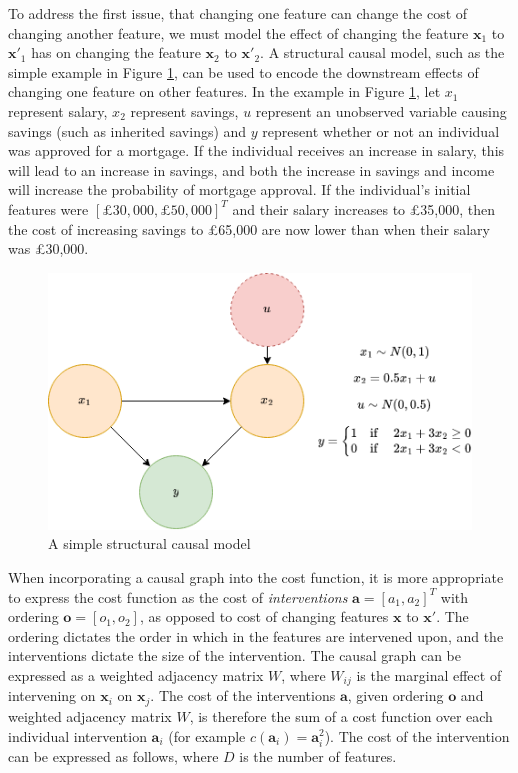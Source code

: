 To address the first issue, that changing one feature can change the cost of changing another feature, we must model the effect of changing the feature $\mathbf{x}_1$ to $\mathbf{x'}_1$ has on changing the feature $\mathbf{x}_2$ to $\mathbf{x'}_2$. A structural causal model, such as the simple example in Figure \ref{fig:toy_scm}, can be used to encode the downstream effects of changing one feature on other features. In the example in Figure \ref{fig:toy_scm}, let $x_1$ represent salary, $x_2$ represent savings, $u$ represent an unobserved variable causing savings (such as inherited savings) and $y$ represent whether or not an individual was approved for a mortgage. If the individual receives an increase in salary, this will lead to an increase in savings, and both the increase in savings and income will increase the probability of mortgage approval. If the individual's initial features were $[£30,000, £50,000]^T$ and their salary increases to £35,000, then the cost of increasing savings to £65,000 are now lower than when their salary was £30,000.

\begin{figure}[!htb]
	\centering
	\includegraphics[width=0.8\linewidth]{images/toy_scm.png}
	\caption{A simple structural causal model}
	\label{fig:toy_scm}
\end{figure}

When incorporating a causal graph into the cost function, it is more appropriate to express the cost function as the cost of \textit{interventions} $\mathbf{a}=[a_1, a_2]^T$ with ordering $\mathbf{o}=[o_1, o_2]$, as opposed to cost of changing features $\mathbf{x}$ to $\mathbf{x}'$. The ordering dictates the order in which in the features are intervened upon, and the interventions dictate the size of the intervention.  The causal graph can be expressed as a weighted adjacency matrix $W$, where $W_{ij}$ is the marginal effect of intervening on $\mathbf{x}_i$ on $\mathbf{x}_j$. The cost of the interventions $\mathbf{a}$, given ordering $\mathbf{o}$ and weighted adjacency matrix $W$, is therefore the sum of a cost function over each individual intervention $\mathbf{a}_i$ (for example $c(\mathbf{a}_i) = \mathbf{a}_i^2$). The cost of the intervention can be expressed as follows, where $D$ is the number of features. 

